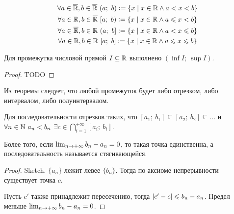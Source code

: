 \begin{gather}
    \forall a \in \overline{\mathbb{R}}, b \in \overline{\mathbb{R}}\ (a;\ b) \vcentcolon= \{x \;\vert\; x \in \mathbb{R} \land a < x < b \} \\
    \forall a \in \mathbb{R}, b \in \overline{\mathbb{R}}\ [a;\ b) \vcentcolon= \{x \;\vert\; x \in \mathbb{R} \land a \leqslant x < b \} \\
    \forall a \in \overline{\mathbb{R}}, b \in \mathbb{R}\ (a;\ b] \vcentcolon= \{x \;\vert\; x \in \mathbb{R} \land a < x \leqslant b \} \\
    \forall a \in \mathbb{R}, b \in \mathbb{R}\ [a;\ b] \vcentcolon= \{x \;\vert\; x \in \mathbb{R} \land a \leqslant x \leqslant b \}
\end{gather}

\begin{theorem}
    Для промежутка числовой прямой $I \subseteq \mathbb{R}$ выполнено $(\inf{I};\ \sup{I})$.
\end{theorem}
\begin{proof}
    TODO
\end{proof}

Из теоремы следует, что любой промежуток будет либо отрезком, либо интервалом, либо полуинтервалом.

\begin{theorem}
    Для последовательности отрезков таких, что $[a_1;\ b_1] \subseteq [a_2;\ b_2] \subseteq \ldots$ и $\forall n \in \mathbb{N}\ a_n < b_n$ $\exists c \in \bigcap_{i=1}^{+\infty} [a_i;\ b_i]$.

    Более того, если $\lim_{n\to+\infty} b_n - a_n =0$, то такая точка единственна, а последовательность называется стягивающейся.
\end{theorem}
\begin{proof}
    Sketch. $\{a_n\}$ лежит левее $\{b_n\}$. Тогда по аксиоме непрерывности существует точка $c$.

    Пусть $c'$ также принадлежит пересечению, тогда $\left\lvert c' - c \right\rvert \leqslant b_n - a_n$. Предел меньше $\lim_{n\to+\infty} b_n - a_n = 0$.
\end{proof}